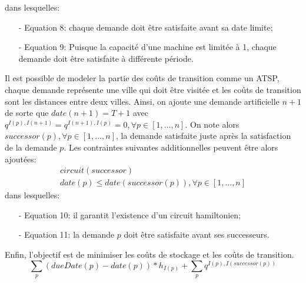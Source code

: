 \documentclass[12pt,a4paper]{article}
\begin{document}
		dans lesquelles:
		\begin{itemize}
			\item[-] Equation 8: chaque demande doit être satisfaite avant sa date limite;
			\item[-] Equation 9: Puisque la capacité d'une machine est limitée à 1, chaque demande doit être satisfaite à différente période.
		\end{itemize}
		Il est possible de modeler la partie des coûts de transition comme un ATSP, chaque demande représente une ville qui doit être visitée et les coûts de transition sont les distances entre deux villes. Ainsi, on ajoute une demande artificielle $n+1$ de sorte que $date(n+1) = T+1$ avec $q^{I(p), I(n+1)} = q^{I(n+1), I(p)} = 0, \forall p \in [1,...,n]$. On note alors $successor(p), \forall p \in [1,...,n]$, la demande satisfaite juste après la satisfaction de la demande $p$. Les contraintes suivantes additionnelles peuvent être alors ajoutées:
		\begin{eqnarray}
			circuit(successor) \\
			date(p) \leq date(successor(p)), \forall p \in [1,...,n]
		\end{eqnarray}
		dans lesquelles:
		\begin{itemize}
			\item[-] Equation 10: il garantit l'existence d'un circuit hamiltonien;
			\item[-] Equation 11: la demande $p$ doit être satisfaite avant ses successeurs.
		\end{itemize}
		
		Enfin, l'objectif est de minimiser les coûts de stockage et les coûts de transition.
		\[
			\sum_{p}{(dueDate(p)-date(p))} * h_{I(p)} + \sum_{p}{q^{I(p),I(successor(p))}}
		\]
		
	
\end{document}
